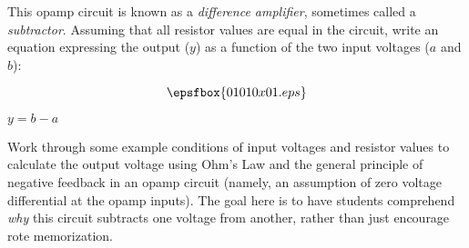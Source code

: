 

This opamp circuit is known as a {\it difference amplifier}, sometimes called a {\it subtractor}.  Assuming that all resistor values are equal in the circuit, write an equation expressing the output ($y$) as a function of the two input voltages ($a$ and $b$):

$$\epsfbox{01010x01.eps}$$







$y = b - a$







Work through some example conditions of input voltages and resistor values to calculate the output voltage using Ohm's Law and the general principle of negative feedback in an opamp circuit (namely, an assumption of zero voltage differential at the opamp inputs).  The goal here is to have students comprehend {\it why} this circuit subtracts one voltage from another, rather than just encourage rote memorization.




